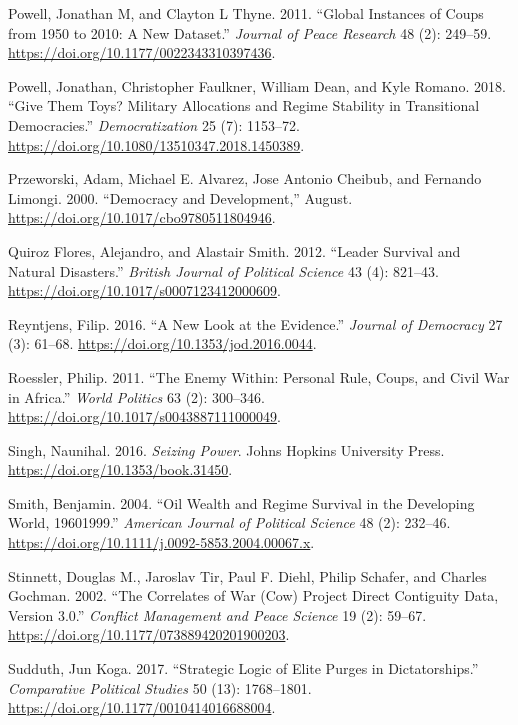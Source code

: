 \documentclass[
  12pt,
]{report}
\newlength{\cslhangindent}
\newenvironment{CSLReferences}[2] %
 {\begin{list}{}{%
  \setlength{\itemindent}{0pt}
  \setlength{\leftmargin}{0pt}
  \setlength{\parsep}{0pt}
  \ifodd #1
   \setlength{\leftmargin}{\cslhangindent}
   \setlength{\itemindent}{-1\cslhangindent}
  \fi
  \setlength{\itemsep}{#2\baselineskip}}}
 {\end{list}}
\begin{document}
\begin{CSLReferences}{1}{0}
Powell, Jonathan M, and Clayton L Thyne. 2011. {``Global Instances of
Coups from 1950 to 2010: A New Dataset.''} \emph{Journal of Peace
Research} 48 (2): 249--59.
\url{https://doi.org/10.1177/0022343310397436}.

Powell, Jonathan, Christopher Faulkner, William Dean, and Kyle Romano.
2018. {``Give Them Toys? Military Allocations and Regime Stability in
Transitional Democracies.''} \emph{Democratization} 25 (7): 1153--72.
\url{https://doi.org/10.1080/13510347.2018.1450389}.

Przeworski, Adam, Michael E. Alvarez, Jose Antonio Cheibub, and Fernando
Limongi. 2000. {``Democracy and Development,''} August.
\url{https://doi.org/10.1017/cbo9780511804946}.

Quiroz Flores, Alejandro, and Alastair Smith. 2012. {``Leader Survival
and Natural Disasters.''} \emph{British Journal of Political Science} 43
(4): 821--43. \url{https://doi.org/10.1017/s0007123412000609}.

Reyntjens, Filip. 2016. {``A New Look at the Evidence.''} \emph{Journal
of Democracy} 27 (3): 61--68.
\url{https://doi.org/10.1353/jod.2016.0044}.

Roessler, Philip. 2011. {``The Enemy Within: Personal Rule, Coups, and
Civil War in Africa.''} \emph{World Politics} 63 (2): 300--346.
\url{https://doi.org/10.1017/s0043887111000049}.

Singh, Naunihal. 2016. \emph{Seizing Power}. Johns Hopkins University
Press. \url{https://doi.org/10.1353/book.31450}.

Smith, Benjamin. 2004. {``Oil Wealth and Regime Survival in the
Developing World, 1960{\textendash}1999.''} \emph{American Journal of
Political Science} 48 (2): 232--46.
\url{https://doi.org/10.1111/j.0092-5853.2004.00067.x}.

Stinnett, Douglas M., Jaroslav Tir, Paul F. Diehl, Philip Schafer, and
Charles Gochman. 2002. {``The Correlates of War (Cow) Project Direct
Contiguity Data, Version 3.0.''} \emph{Conflict Management and Peace
Science} 19 (2): 59--67.
\url{https://doi.org/10.1177/073889420201900203}.

Sudduth, Jun Koga. 2017. {``Strategic Logic of Elite Purges in
Dictatorships.''} \emph{Comparative Political Studies} 50 (13):
1768--1801. \url{https://doi.org/10.1177/0010414016688004}.


\end{CSLReferences}
\end{document}
